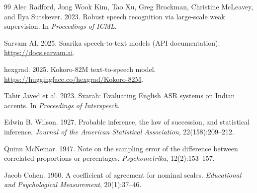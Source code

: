 \documentclass[11pt,a4paper]{article}
\begin{document}
\begin{thebibliography}{99}
 Alec Radford, Jong Wook Kim, Tao Xu, Greg Brockman, Christine McLeavey, and Ilya Sutskever. 2023.
Robust speech recognition via large-scale weak supervision. In \emph{Proceedings of ICML}.

 Sarvam AI. 2025. Saarika speech-to-text models (API documentation). \url{https://docs.sarvam.ai}.

 hexgrad. 2025. Kokoro-82M text-to-speech model. \url{https://huggingface.co/hexgrad/Kokoro-82M}.

 Tahir Javed et al. 2023. Svarah: Evaluating English ASR systems on Indian accents. In
\emph{Proceedings of Interspeech}.

 Edwin B. Wilson. 1927. Probable inference, the law of succession, and statistical inference.
\emph{Journal of the American Statistical Association}, 22(158):209--212.

 Quinn McNemar. 1947. Note on the sampling error of the difference between correlated proportions or
percentages. \emph{Psychometrika}, 12(2):153--157.

 Jacob Cohen. 1960. A coefficient of agreement for nominal scales. \emph{Educational and Psychological
Measurement}, 20(1):37--46.

\end{thebibliography}
\end{document}
